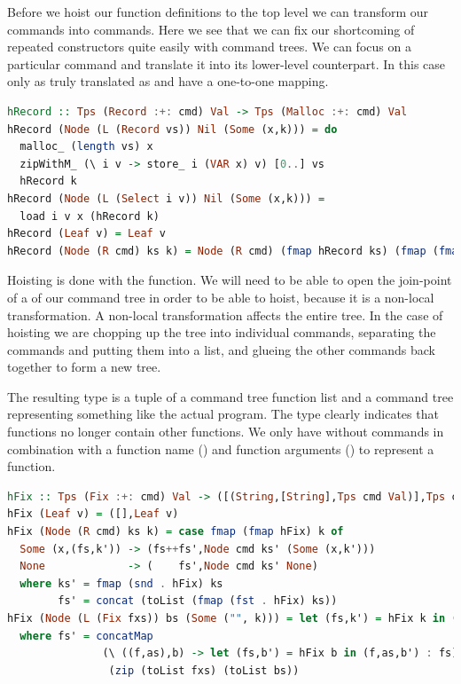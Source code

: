 Before we hoist our function definitions to the top level we can transform our  commands into  commands. Here we see that we can fix our shortcoming of repeated constructors quite easily with command trees. We can focus on a particular command and translate it into its lower-level counterpart. In this case only  as truly translated as  and  have a one-to-one mapping.

\begin{lstlisting}[language=Haskell]
hRecord :: Tps (Record :+: cmd) Val -> Tps (Malloc :+: cmd) Val
hRecord (Node (L (Record vs)) Nil (Some (x,k))) = do
  malloc_ (length vs) x
  zipWithM_ (\ i v -> store_ i (VAR x) v) [0..] vs
  hRecord k
hRecord (Node (L (Select i v)) Nil (Some (x,k))) =
  load i v x (hRecord k)
hRecord (Leaf v) = Leaf v
hRecord (Node (R cmd) ks k) = Node (R cmd) (fmap hRecord ks) (fmap (fmap hRecord) k)
\end{lstlisting}

Hoisting is done with the  function. We will need to be able to open the join-point of a  of our command tree in order to be able to hoist, because it is a non-local transformation. A non-local transformation affects the entire tree. In the case of hoisting we are chopping up the tree into individual commands, separating the  commands and putting them into a list, and glueing the other commands back together to form a new tree.

The resulting type is a tuple of a command tree function list and a command tree representing something like the actual program. The type clearly indicates that functions no longer contain other functions. We only have  without  commands in combination with a function name () and function arguments (\icode{[String]}) to represent a function.

\begin{lstlisting}[language=Haskell]
hFix :: Tps (Fix :+: cmd) Val -> ([(String,[String],Tps cmd Val)],Tps cmd Val)
hFix (Leaf v) = ([],Leaf v)
hFix (Node (R cmd) ks k) = case fmap (fmap hFix) k of
  Some (x,(fs,k')) -> (fs++fs',Node cmd ks' (Some (x,k')))
  None             -> (    fs',Node cmd ks' None)
  where ks' = fmap (snd . hFix) ks
        fs' = concat (toList (fmap (fst . hFix) ks))
hFix (Node (L (Fix fxs)) bs (Some ("", k))) = let (fs,k') = hFix k in (fs'++fs,k')
  where fs' = concatMap 
               (\ ((f,as),b) -> let (fs,b') = hFix b in (f,as,b') : fs) 
                (zip (toList fxs) (toList bs))
\end{lstlisting}

